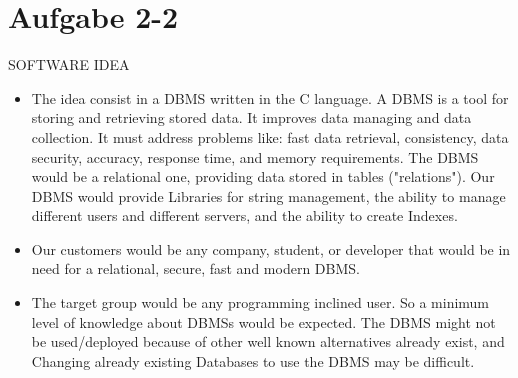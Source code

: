 \chapter{Aufgabe 2-2} %
{\LARGE SOFTWARE IDEA}
\begin{itemize}
	\item The idea consist in a DBMS written in the C language. A DBMS is a tool for storing and retrieving stored data. It improves data managing and data collection. It must address problems like: fast data retrieval, consistency, data security, accuracy, response time, and memory requirements. The DBMS would be a relational one, providing data stored in tables ("relations"). Our DBMS would provide Libraries for string management, the ability to manage different users and different servers, and the ability to create Indexes.
	 \item Our customers would be any company, student, or developer that would be in need for a relational, secure, fast and modern DBMS. 
	\item The target group would be any programming inclined user. So a minimum level of knowledge about DBMSs would be expected. The DBMS might not be used/deployed because of other well known alternatives already exist, and Changing already existing Databases to use the DBMS may be difficult.
\end{itemize}



